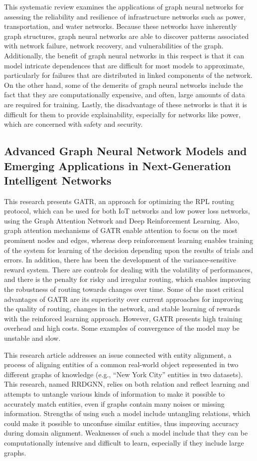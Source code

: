 \documentclass[a4paper,fleqn]{cas-dc}
\numberwithin{equation}{section}
\begin{document}
This systematic review\cite{Liu2025164883} examines the applications of graph neural networks for assessing the reliability and resilience of infrastructure networks such as power, transportation, and water networks. Because these networks have inherently graph structures, graph neural networks are able to discover patterns associated with network failure, network recovery, and vulnerabilities of the graph. Additionally, the benefit of graph neural networks in this respect is that it can model intricate dependences that are difficult for most models to approximate, particularly for failures that are distributed in linked components of the network. On the other hand, some of the demerits of graph neural networks include the fact that they are computationally expensive, and often, large amounts of data are required for training. Lastly, the disadvantage of these networks is that it is difficult for them to provide explainability, especially for networks like power, which are concerned with safety and security.
\subsection{Advanced Graph Neural Network Models and Emerging Applications in Next-Generation Intelligent Networks}
This research \cite{Wang2025} presents GATR, an approach for optimizing the RPL routing protocol, which can be used for both IoT networks and low power loss networks, using the Graph Attention Network and Deep Reinforcement Learning. Also, graph attention mechanisms of GATR enable attention to focus on the most prominent nodes and edges, whereas deep reinforcement learning enables training of the system for learning of the decision depending upon the results of trials and errors. In addition, there has been the development of the variance-sensitive reward system. There are controls for dealing with the volatility of performances, and there is the penalty for risky and irregular routing, which enables improving the robustness of routing towards changes over time. Some of the most critical advantages of GATR are its superiority over current approaches for improving the quality of routing, changes in the network, and stable learning of rewards with the reinforced learning approach. However, GATR presents high training overhead and high costs. Some examples of convergence of the model may be unstable and slow.



This research article \cite{Shi2025} addresses an issue connected with entity alignment, a process of aligning entities of a common real-world object represented in two different graphs of knowledge (e.g., “New York City” entities in two datasets). This research, named RRDGNN, relies on both relation and reflect learning and attempts to untangle various kinds of information to make it possible to accurately match entities, even if graphs contain many noises or missing information. Strengths of using such a model include untangling relations, which could make it possible to unconfuse similar entities, thus improving accuracy during domain alignment. Weaknesses of such a model include that they can be computationally intensive and difficult to learn, especially if they include large graphs.
\end{document}
